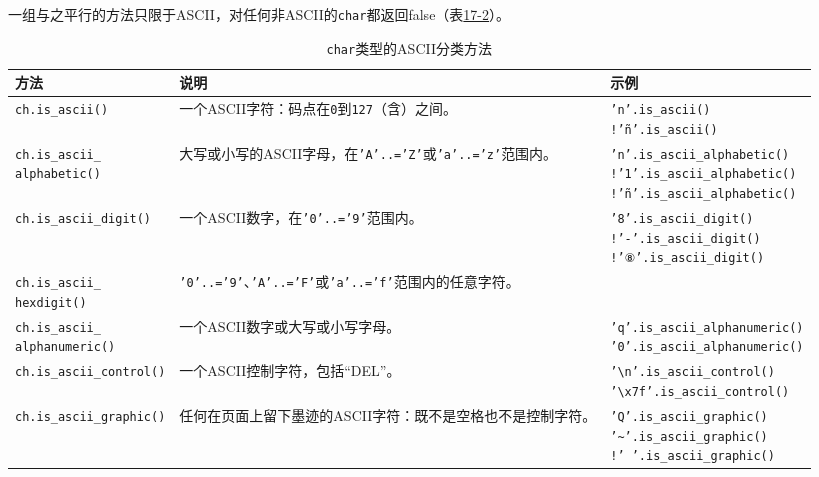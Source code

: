 一组与之平行的方法只限于ASCII，对任何非ASCII的\texttt{char}都返回false（表\hyperref[t17-2]{17-2}）。

\begin{longtable}{p{}p{}p{}}
    \caption{\texttt{char}类型的ASCII分类方法}
    \label{t17-2}\\
    \hline
    \textbf{方法} & \textbf{说明} & \textbf{示例} \\
    \hline
    \texttt{ch.is\_ascii()} & 一个ASCII字符：码点在\texttt{0}到\texttt{127}（含）之间。 &
    \makecell[l]{\texttt{'n'.is\_ascii()}\\ \texttt{!'ñ'.is\_ascii()}} \\
    \rowcolor{tablecolor}
    \makecell[l]{\texttt{ch.is\_ascii\_}\\ \texttt{alphabetic()}} & 大写或小写的ASCII字母，在\texttt{'A'..='Z'}或\texttt{'a'..='z'}范围内。 &
    \makecell[l]{\texttt{'n'.is\_ascii\_alphabetic()}\\ \texttt{!'1'.is\_ascii\_alphabetic()}\\ \texttt{!'ñ'.is\_ascii\_alphabetic()}} \\
    \texttt{ch.is\_ascii\_digit()} & 一个ASCII数字，在\texttt{'0'..='9'}范围内。 &
    \makecell[l]{\texttt{'8'.is\_ascii\_digit()}\\ \texttt{!'-'.is\_ascii\_digit()}\\ \texttt{!'⑧'.is\_ascii\_digit()}} \\
    \rowcolor{tablecolor}
    \makecell[l]{\texttt{ch.is\_ascii\_}\\ \texttt{hexdigit()}} & \texttt{'0'..='9'}、\texttt{'A'..='F'}或\texttt{'a'..='f'}范围内的任意字符。 & \\
    \makecell[l]{\texttt{ch.is\_ascii\_}\\ \texttt{alphanumeric()}} & 一个ASCII数字或大写或小写字母。 &
    \makecell[l]{\texttt{'q'.is\_ascii\_alphanumeric()}\\ \texttt{'0'.is\_ascii\_alphanumeric()}} \\
    \rowcolor{tablecolor}
    \texttt{ch.is\_ascii\_control()} & 一个ASCII控制字符，包括“DEL”。 &
    \makecell[l]{\texttt{'\textbackslash n'.is\_ascii\_control()}\\ \texttt{'\textbackslash x7f'.is\_ascii\_control()}} \\
    \texttt{ch.is\_ascii\_graphic()} & 任何在页面上留下墨迹的ASCII字符：既不是空格也不是控制字符。 &
    \makecell[l]{\texttt{'Q'.is\_ascii\_graphic()}\\ \texttt{'\textasciitilde{}'.is\_ascii\_graphic()}\\ \texttt{!' '.is\_ascii\_graphic()}} \\

\end{longtable}
